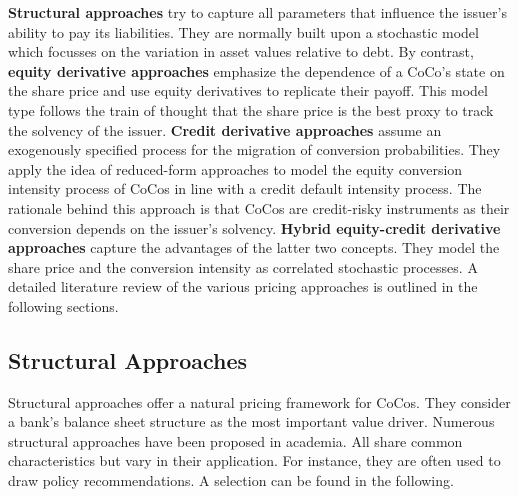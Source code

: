 \textbf{Structural approaches} try to capture all parameters that influence the issuer's ability to pay its liabilities. They are normally built upon a stochastic model which focusses on the variation in asset values relative to debt. \citep{duffie2003credit} By contrast, \textbf{equity derivative approaches} emphasize the dependence of a CoCo's state on the share price and use equity derivatives to replicate their payoff. This model type follows the train of thought that the share price is the best proxy to track the solvency of the issuer. \textbf{Credit derivative approaches} assume an exogenously specified process for the migration of conversion probabilities. They apply the idea of reduced-form approaches to model the equity conversion intensity process of CoCos in line with a credit default intensity process. The rationale behind this approach is that CoCos are credit-risky instruments as their conversion depends on the issuer's solvency. \citep{wilkens2014contingent} \textbf{Hybrid equity-credit derivative approaches} capture the advantages of the latter two concepts. They model the share price and the conversion intensity as correlated stochastic processes. \citep{turfus2015cocos} A detailed literature review of the various pricing approaches is outlined in the following sections.

\subsection*{Structural Approaches}
Structural approaches offer a natural pricing framework for CoCos. They consider a bank's balance sheet structure as the most important value driver. Numerous structural approaches have been proposed in academia. All share common characteristics but vary in their application. \citep{wilkens2014contingent} For instance, they are often used to draw policy recommendations. A selection can be found in the following.\\ 


